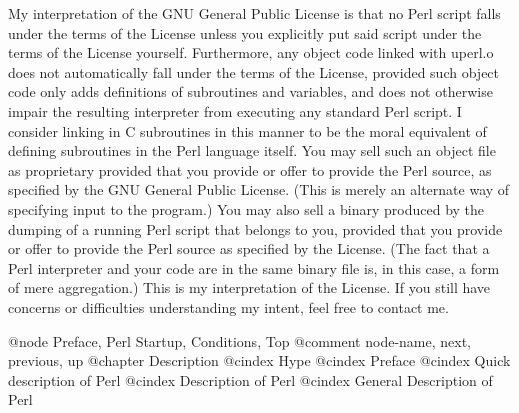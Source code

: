 My interpretation of the GNU General Public License is that no Perl
script falls under the terms of the License unless you explicitly put
said script under the terms of the License yourself.  Furthermore, any
object code linked with uperl.o does not automatically fall under the
terms of the License, provided such object code only adds definitions
of subroutines and variables, and does not otherwise impair the
resulting interpreter from executing any standard Perl script.  I
consider linking in C subroutines in this manner to be the moral
equivalent of defining subroutines in the Perl language itself.  You
may sell such an object file as proprietary provided that you provide
or offer to provide the Perl source, as specified by the GNU General
Public License.  (This is merely an alternate way of specifying input
to the program.)  You may also sell a binary produced by the dumping of
a running Perl script that belongs to you, provided that you provide or
offer to provide the Perl source as specified by the License.  (The
fact that a Perl interpreter and your code are in the same binary file
is, in this case, a form of mere aggregation.)  This is my
interpretation of the License.  If you still have concerns or
difficulties understanding my intent, feel free to contact me.

@node     Preface, Perl Startup, Conditions, Top
@comment  node-name,  next,  previous,  up
@chapter Description
@cindex Hype
@cindex Preface
@cindex Quick description of Perl
@cindex Description of Perl
@cindex General Description of Perl

